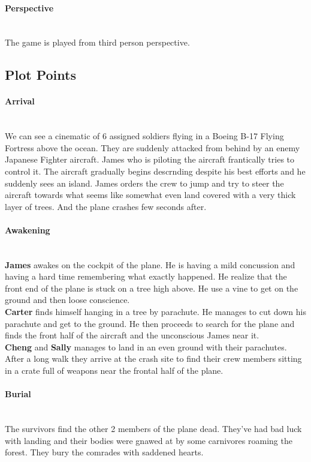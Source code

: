             \paragraph{Perspective}\mbox{}\\
                The game is played from third person perspective.
    \subsection{Plot Points}
        \paragraph{Arrival}\mbox{}\\
            We can see a cinematic of 6 assigned soldiers flying in a Boeing 
            B-17 Flying Fortress above the ocean. They are suddenly attacked 
            from behind by an enemy Japanese Fighter aircraft. James who is piloting 
            the aircraft frantically tries to control it. The aircraft gradually begins descrnding
            despite his best efforts and he suddenly sees an island. James orders the crew
            to jump and try to steer the aircraft towards what seems like somewhat 
            even land covered with a very thick layer of trees. And the plane crashes 
            few seconds after.
        \paragraph{Awakening}\mbox{}\\
            \textbf{James} awakes on the cockpit of the plane. He is having a mild 
            concussion and having a hard time remembering what exactly happened. He 
            realize that the front end of the plane is stuck on a tree high above. He 
            use a vine to get on the ground and then loose conscience. \\
            \textbf{Carter} finds himself hanging in a tree by parachute. He manages
            to cut down his parachute and get to the ground. He then proceeds to search
            for the plane and finds the front half of the aircraft and the unconscious 
            James near it. \\
            \textbf{Cheng} and \textbf{Sally} manages to land in an even ground with their
            parachutes. After a long walk they arrive at the crash site to find their crew
            members sitting in a crate full of weapons near the frontal half of the plane. 
        \paragraph{Burial}\mbox{}\\
            The survivors find the other 2 members of the plane dead. They've had bad luck
            with landing and their bodies were gnawed at by some carnivores roaming the forest. 
            They bury the comrades with saddened hearts. 
